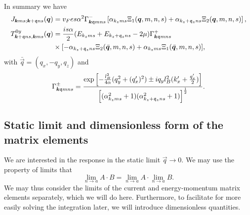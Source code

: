 \begin{summary}
  \label{summary:tilt:matrixelements}
  In summary we have
  \begin{align}
    \label{eq:112}
    J_{\bm{k} m s; \bm{k} + \mathfrak{q} n s} (\bm{q}) &=
                                                        v_{F} e s \alpha^2
                                                        \Gamma ^-_{\bm{k} \mathfrak{q} m n s}
                                                        \left[ \alpha_{k_z m s} \Xi_{1} (\bm{q}, m, n, s)
                                                        + \alpha_{k_z + \mathfrak{q}_z n s} \Xi _{2} (\bm{q}, m, n, s) \right],\\
    T_{\bm{k} + \mathfrak{q} n s, \bm{k} m s}^{0y} (\bm{q}) &=
                                                             \frac{is \alpha}{2}
                                                             (E_{k_z m s} + E_{k_z + \mathfrak{q}_z n  s} - 2 \mu) \Gamma ^+_{\bm{k} \mathfrak{q} m n s} \\
    \nonumber &\times [- \alpha_{k_z + \mathfrak{q}_z n s} \Xi_{2} (\bar{\bm{q}}, m, n, s) + \alpha_{k_z m s} \Xi_{1}(\bar{\bm{q}}, m, n, s)],
  \end{align}
  with \( \bar{\vec{q}} = (q_x, -q_y, q_z) \) and
  \[
    \Gamma _{\bm{k} \mathfrak{q} m n s}^{\pm} =
    \frac{
      \exp
      \left[
        - \frac{l_{B}^2}{4 \alpha } (q_{y}^2 + (q' _x)^2) \pm  i q_y l_B^2 (k' _x + \frac{q'_x}{2} )
      \right]
    }{
      \left[(\alpha_{k_z m s}^2 +1) (\alpha_{k_z + \mathfrak{q}_z ns} ^2 + 1)\right]^{\frac{1}{2}}
    }.
  \]
\end{summary}
\subsection{Static limit and dimensionless form of the matrix elements}
We are interested in the response in the static limit \( \vec{q} \to  0 \).
We may use the property of limits that
\[
  \lim_{n \to a} A \cdot  B = \lim_{n \to a} A \cdot \lim_{n \to a} B.
\]
We may thus consider the limits of the current and energy-momentum matrix elements separately, which we will do here.
Furthermore, to facilitate for more easily solving the integration later, we will introduce dimensionless quantities.

